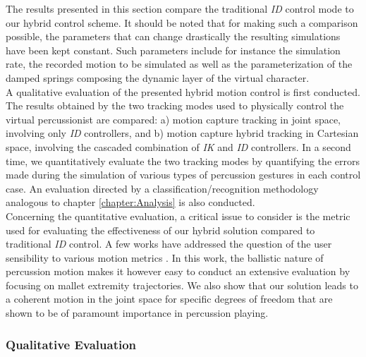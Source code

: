 The results presented in this section compare the traditional \emph{ID} control mode to our hybrid control scheme. It should be noted that for making such a comparison possible, the parameters that can change drastically the resulting simulations have been kept constant. Such parameters include for instance the simulation rate, the recorded motion to be simulated as well as the parameterization of the damped springs composing the dynamic layer of the virtual character.\\

A qualitative evaluation of the presented hybrid motion control is first conducted. The results obtained by the two tracking modes used to physically control the virtual percussionist are compared: a) motion capture tracking in joint space, involving only \emph{ID} controllers, and b) motion capture hybrid tracking in Cartesian space, involving the cascaded combination of \emph{IK} and \emph{ID} controllers. In a second time, we quantitatively evaluate the two tracking modes by quantifying the errors made during the simulation of various types of percussion gestures in each control case. An evaluation directed by a classification/recognition methodology analogous to chapter \ref{chapter:Analysis} is also conducted.\\


Concerning the quantitative evaluation, a critical issue to consider is the metric used for evaluating the effectiveness of our hybrid solution compared to traditional \emph{ID} control. A few works have addressed the question of the user sensibility to various motion metrics . In this work, the ballistic nature of percussion motion makes it however easy to conduct an extensive evaluation by focusing on mallet extremity trajectories. We also show that our solution leads to a coherent motion in the joint space for specific degrees of freedom that are shown to be of paramount importance in percussion playing.


			\subsubsection{Qualitative Evaluation}
			\label{subsubsec:Synthesis_Physics_Results_QualitativeEval}

